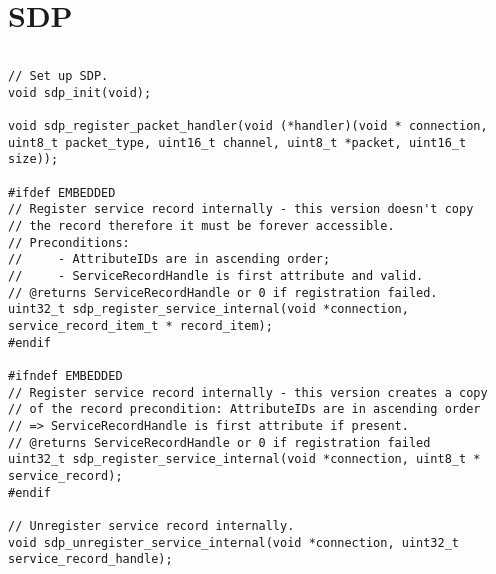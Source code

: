\section{SDP}
\label{appendix:api_sdp}
$ $
\begin{lstlisting}
// Set up SDP.
void sdp_init(void);

void sdp_register_packet_handler(void (*handler)(void * connection, uint8_t packet_type, uint16_t channel, uint8_t *packet, uint16_t size));

#ifdef EMBEDDED
// Register service record internally - this version doesn't copy 
// the record therefore it must be forever accessible.
// Preconditions:
//     - AttributeIDs are in ascending order;
//     - ServiceRecordHandle is first attribute and valid.
// @returns ServiceRecordHandle or 0 if registration failed.
uint32_t sdp_register_service_internal(void *connection, service_record_item_t * record_item);
#endif

#ifndef EMBEDDED
// Register service record internally - this version creates a copy
// of the record precondition: AttributeIDs are in ascending order
// => ServiceRecordHandle is first attribute if present.
// @returns ServiceRecordHandle or 0 if registration failed
uint32_t sdp_register_service_internal(void *connection, uint8_t * service_record);
#endif

// Unregister service record internally.
void sdp_unregister_service_internal(void *connection, uint32_t service_record_handle);
\end{lstlisting}
\pagebreak
